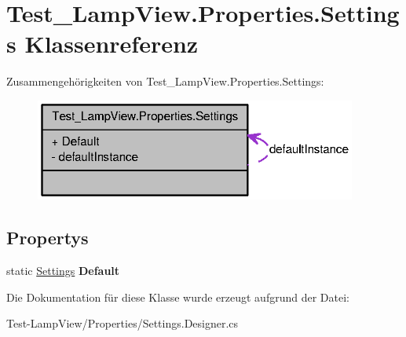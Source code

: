 \hypertarget{class_test___lamp_view_1_1_properties_1_1_settings}{
\section{Test\_\-LampView.Properties.Settings Klassenreferenz}
\label{class_test___lamp_view_1_1_properties_1_1_settings}
}


Zusammengehörigkeiten von Test\_\-LampView.Properties.Settings:\nopagebreak
\begin{figure}[H]
\begin{center}
\leavevmode
\includegraphics[width=300pt]{class_test___lamp_view_1_1_properties_1_1_settings__coll__graph}
\end{center}
\end{figure}
\subsection*{Propertys}
\begin{DoxyCompactItemize}
\item 
\hypertarget{class_test___lamp_view_1_1_properties_1_1_settings_a267d3826b179e5625ea4c88e093e5e73}{
static \hyperlink{class_test___lamp_view_1_1_properties_1_1_settings}{Settings} {\bfseries Default}}
\label{class_test___lamp_view_1_1_properties_1_1_settings_a267d3826b179e5625ea4c88e093e5e73}

\end{DoxyCompactItemize}


Die Dokumentation für diese Klasse wurde erzeugt aufgrund der Datei:\begin{DoxyCompactItemize}
\item 
Test-\/LampView/Properties/Settings.Designer.cs\end{DoxyCompactItemize}
